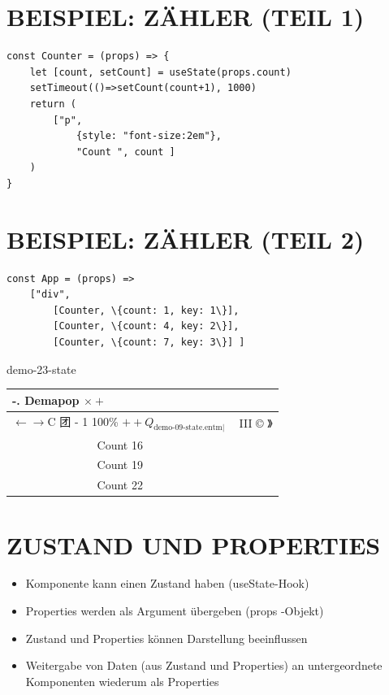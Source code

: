 \section*{BEISPIEL: ZÄHLER (TEIL 1)}
\begin{verbatim}
const Counter = (props) => {
    let [count, setCount] = useState(props.count)
    setTimeout(()=>setCount(count+1), 1000)
    return (
        ["p",
            {style: "font-size:2em"},
            "Count ", count ]
    )
}
\end{verbatim}

\section*{BEISPIEL: ZÄHLER (TEIL 2)}
\begin{verbatim}
const App = (props) =>
    ["div",
        [Counter, \{count: 1, key: 1\}],
        [Counter, \{count: 4, key: 2\}],
        [Counter, \{count: 7, key: 3\}] ]
\end{verbatim}

demo-23-state

\begin{center}
\begin{tabular}{|c|c|}
\hline
\multicolumn{2}{|l|}{-. Demapop $\times+$} \\
\hline
$\leftarrow \rightarrow \mathrm{C}$ 团 - 1 100\% $++Q_{\text {demo-09-state.entm| }}$ & III © 》 \\
\hline
Count 16 &  \\
\hline
Count 19 &  \\
\hline
Count 22 &  \\
\hline
\end{tabular}
\end{center}

\section*{ZUSTAND UND PROPERTIES}
\begin{itemize}
  \item Komponente kann einen Zustand haben (useState-Hook)
  \item Properties werden als Argument übergeben (props -Objekt)
  \item Zustand und Properties können Darstellung beeinflussen
  \item Weitergabe von Daten (aus Zustand und Properties) an untergeordnete Komponenten wiederum als Properties
\end{itemize}

